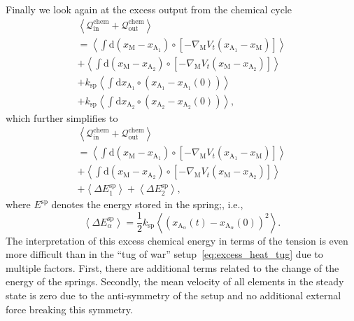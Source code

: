 \documentclass[aps,pre,twocolumn,showpacs,showkeys,superscriptaddress,floatfix]{revtex4-1}
\newcommand{\rmd}{{\mathrm d}}
\begin{document}
Finally we look again at the excess output from the chemical cycle
\begin{multline*}
\left\langle 
{\mathcal Q}_\text{in}^\text{chem} + {\mathcal Q}_\text{out}^\text{chem} 
\right\rangle 
\\
= 
\left\langle 
\int \rmd \left( x_\text{M} - x_{\text{A}_1} \right) \circ \left[ - \nabla_\text{M} V_t( x_{\text{A}_1} - x_\text{M} ) \right]
\right\rangle 
\\
+
\left\langle 
\int \rmd \left( x_\text{M} - x_{\text{A}_2} \right) \circ \left[ - \nabla_\text{M} V_t( x_\text{M} - x_{\text{A}_2} ) \right] 
\right\rangle 
\\
+ k_\text{sp} \left\langle \int \rmd x_{\text{A}_1} \circ \left( x_{\text{A}_1} - x_{\text{A}_1}(0) \right) \right\rangle
\\ 
+ k_\text{sp} \left\langle \int \rmd x_{\text{A}_2} \circ \left( x_{\text{A}_2} - x_{\text{A}_2}(0) \right) \right\rangle
,
\end{multline*} 
which further simplifies to 
\begin{multline*}
\left\langle 
{\mathcal Q}_\text{in}^\text{chem} + {\mathcal Q}_\text{out}^\text{chem} 
\right\rangle 
\\
= 
\left\langle 
\int \rmd \left( x_\text{M} - x_{\text{A}_1} \right) \circ \left[ - \nabla_\text{M} V_t( x_{\text{A}_1} - x_\text{M} ) \right]
\right\rangle 
\\
+
\left\langle 
\int \rmd \left( x_\text{M} - x_{\text{A}_2} \right) \circ \left[ - \nabla_\text{M} V_t( x_\text{M} - x_{\text{A}_2} ) \right]
\right\rangle 
\\
+ \left\langle 
\Delta E^\text{sp}_1 
\right\rangle
+ \left\langle 
\Delta E^\text{sp}_2 
\right\rangle ,
\end{multline*} 
where $E^\text{sp}$ denotes the energy stored in the spring;, i.e.,
\[
\left\langle \Delta E^\text{sp}_\alpha \right\rangle 
= 
\frac{1}{2} k_\text{sp}
\left\langle
\left( 
x_{\text{A}_\alpha}(t) 
- 
x_{\text{A}_\alpha}(0)  
\right)^2 
\right\rangle
.
\]
The interpretation of this excess chemical energy in terms of the tension is even more difficult than in the ``tug of war'' setup~\eqref{eq:excess_heat_tug} due to multiple factors.
First, there are additional terms related to the change of the energy of the springs.
Secondly, the mean velocity of all elements in the steady state is zero due to the anti-symmetry of the setup and no additional external force breaking this symmetry. 
\end{document}
